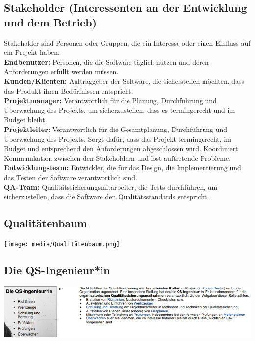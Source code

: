 \documentclass{article}
\begin{document}
\subsection*{Stakeholder (Interessenten an der Entwicklung und dem Betrieb)}
Stakeholder sind Personen oder Gruppen, die ein Interesse oder einen Einfluss auf ein Projekt haben.\\
\textbf{Endbenutzer:} Personen, die die Software täglich nutzen und deren Anforderungen erfüllt werden müssen.\\
\textbf{Kunden/Klienten:} Auftraggeber der Software, die sicherstellen möchten, dass das Produkt ihren Bedürfnissen entspricht.\\
\textbf{Projektmanager:} Verantwortlich für die Planung, Durchführung und Überwachung des Projekts, um sicherzustellen, dass es termingerecht und im Budget bleibt.\\
\textbf{Projektleiter:} Verantwortlich für die Gesamtplanung, Durchführung und Überwachung des Projekts. Sorgt dafür, dass das Projekt termingerecht, im Budget und entsprechend den Anforderungen abgeschlossen wird. Koordiniert Kommunikation zwischen den Stakeholdern und löst auftretende Probleme.\\
\textbf{Entwicklungsteam:} Entwickler, die für das Design, die Implementierung und das Testen der Software verantwortlich sind.\\
\textbf{QA-Team:} Qualitätssicherungsmitarbeiter, die Tests durchführen, um sicherzustellen, dass die Software den Qualitätsstandards entspricht.\\

\subsection*{Qualitätenbaum}
\texttt{[image: media/Qualitätenbaum.png]}

\subsection*{Die QS-Ingenieur*in}
\includegraphics[scale=1.18]{media/QS_Ingenieur.png}
\end{document}
